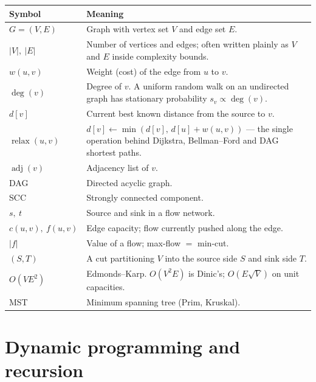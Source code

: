 \documentclass[10pt,letterpaper,onecolumn]{article}
\makeatletter
\newenvironment{symtab}
  {\begin{longtable}{@{}>{\raggedright\arraybackslash}p{0.26\textwidth}%
                       >{\raggedright\arraybackslash}p{0.70\textwidth}@{}}
   \toprule
   \textbf{Symbol} & \textbf{Meaning} \\
   \midrule
   \endhead
   \bottomrule
   \endfoot}
  {\end{longtable}}
\makeatother
\begin{document}
\begin{symtab}
$G=(V,E)$ & Graph with vertex set $V$ and edge set $E$. \\
$|V|,\ |E|$ & Number of vertices and edges; often written plainly as $V$ and $E$ inside complexity bounds. \\
$w(u,v)$ & Weight (cost) of the edge from $u$ to $v$. \\
$\deg(v)$ & Degree of $v$. A uniform random walk on an undirected graph has stationary probability $s_v \propto \deg(v)$. \\
$d[v]$ & Current best known distance from the source to $v$. \\
$\operatorname{relax}(u,v)$ & $d[v] \leftarrow \min(d[v],\, d[u]+w(u,v))$ — the single operation behind Dijkstra, Bellman--Ford and DAG shortest paths. \\
$\operatorname{adj}(v)$ & Adjacency list of $v$. \\
DAG & Directed acyclic graph. \\
SCC & Strongly connected component. \\
$s,\ t$ & Source and sink in a flow network. \\
$c(u,v),\ f(u,v)$ & Edge capacity; flow currently pushed along the edge. \\
$|f|$ & Value of a flow; max-flow $=$ min-cut. \\
$(S,T)$ & A cut partitioning $V$ into the source side $S$ and sink side $T$. \\
$O(VE^2)$ & Edmonds--Karp. $O(V^2E)$ is Dinic's; $O(E\sqrt{V})$ on unit capacities. \\
MST & Minimum spanning tree (Prim, Kruskal). \\
\end{symtab}

\section{Dynamic programming and recursion}
\end{document}
